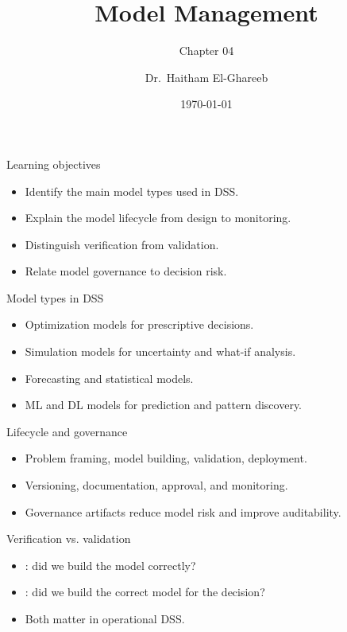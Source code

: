 \documentclass[aspectratio=169,11pt]{beamer}
\title[Model Management]{Model Management}
\subtitle{Chapter 04}
\author{Dr.\ Haitham El-Ghareeb}
\institute{Faculty of Computers and Information Sciences}
\date{\today}
\begin{document}
\begin{frame}
  \titlepage
\end{frame}

\begin{frame}{Learning objectives}
  \begin{itemize}
    \item Identify the main model types used in DSS.
    \item Explain the model lifecycle from design to monitoring.
    \item Distinguish verification from validation.
    \item Relate model governance to decision risk.
  \end{itemize}
\end{frame}

\begin{frame}{Model types in DSS}
  \begin{itemize}
    \item Optimization models for prescriptive decisions.
    \item Simulation models for uncertainty and what-if analysis.
    \item Forecasting and statistical models.
    \item ML and DL models for prediction and pattern discovery.
  \end{itemize}
\end{frame}

\begin{frame}{Lifecycle and governance}
  \begin{itemize}
    \item Problem framing, model building, validation, deployment.
    \item Versioning, documentation, approval, and monitoring.
    \item Governance artifacts reduce model risk and improve auditability.
  \end{itemize}
\end{frame}

\begin{frame}{Verification vs. validation}
  \begin{itemize}
    \item {}: did we build the model correctly?
    \item {}: did we build the correct model for the decision?
    \item Both matter in operational DSS.
  \end{itemize}
\end{frame}
\end{document}
